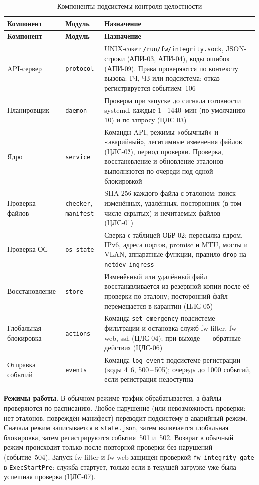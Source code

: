 {\small
\begin{longtable}{|L{3.4cm}|L{2.6cm}|L{8.2cm}|}
\caption{Компоненты подсистемы контроля целостности}\label{tab:integrity-parts}\\
\hline
\textbf{Компонент} & \textbf{Модуль} & \textbf{Назначение}\\
\hline\endfirsthead
\hline
\textbf{Компонент} & \textbf{Модуль} & \textbf{Назначение}\\
\hline\endhead
API-сервер & \texttt{protocol} &
  UNIX-сокет \texttt{/run/fw/integrity.sock}, JSON-строки (АПИ-03, АПИ-04),
  коды ошибок (АПИ-09). Права проверяются по контексту вызова: ТЧ, ЧЗ или
  подсистема; отказ регистрируется событием~106\\ \hline
Планировщик & \texttt{daemon} &
  Проверка при запуске до сигнала готовности systemd, каждые
  1\,--\,1440~мин (по умолчанию 10) и по запросу (ЦЛС-03)\\ \hline
Ядро & \texttt{service} &
  Команды API, режимы «обычный» и «аварийный», легитимные изменения
  файлов (ЦЛС-02), период проверки. Проверка, восстановление и обновление
  эталонов выполняются по очереди под одной блокировкой\\ \hline
Проверка файлов & \texttt{checker}, \texttt{manifest} &
  SHA-256 каждого файла с эталоном; поиск изменённых, удалённых,
  посторонних (в том числе скрытых) и нечитаемых файлов (ЦЛС-01)\\ \hline
Проверка ОС & \texttt{os\_state} &
  Сверка с таблицей ОБР-02: пересылка ядром, IPv6, адреса портов, promisc
  и MTU, мосты и VLAN, аппаратные функции, правило \texttt{drop} на
  \texttt{netdev ingress}\\ \hline
Восстановление & \texttt{store} &
  Изменённый или удалённый файл восстанавливается из резервной копии
  после её проверки по эталону; посторонний файл перемещается в карантин
  (ЦЛС-05)\\ \hline
Глобальная блокировка & \texttt{actions} &
  Команда \texttt{set\_emergency} подсистеме фильтрации и остановка
  служб fw-filter, fw-web, ssh (ЦЛС-04); при выходе~— обратные действия
  (ЦЛС-06)\\ \hline
Отправка событий & \texttt{events} &
  Команда \texttt{log\_event} подсистеме регистрации (коды 416,
  500\,--\,505); очередь до 1000 событий, если регистрация недоступна\\ \hline
\end{longtable}
}

\textbf{Режимы работы.} В обычном режиме трафик обрабатывается, а файлы
проверяются по расписанию. Любое нарушение (или невозможность проверки:
нет эталонов, повреждён манифест) переводит подсистему в аварийный режим.
Сначала режим записывается в \texttt{state.json}, затем включается
глобальная блокировка, затем регистрируются события~501 и~502.
Возврат в обычный режим происходит только после повторной проверки без
нарушений (событие~504). Запуск fw-filter и fw-web защищён проверкой
\texttt{fw-integrity gate} в \texttt{ExecStartPre}: служба стартует, только
если в текущей загрузке уже была успешная проверка (ЦЛС-07).

